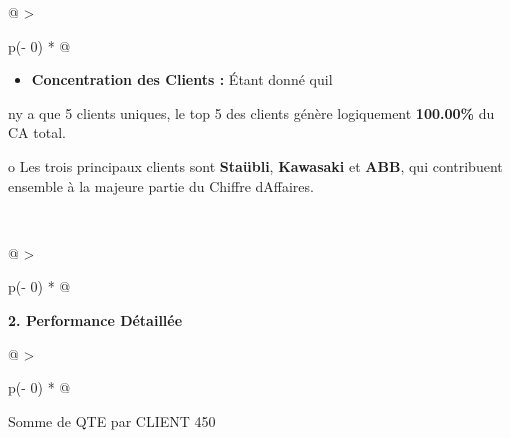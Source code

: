 \documentclass[
]{article}
\begin{document}
\begin{longtable}[]{@{}
  >{\raggedright\arraybackslash}p{(\columnwidth - 0\tabcolsep) * }@{}}
\begin{minipage}[b]{\linewidth}
\begin{itemize}
\item \textbf{Concentration des Clients :} Étant donné qu\textquotesingle il
\end{itemize}
n\textquotesingle y a que 5 clients uniques, le top 5 des clients génère
logiquement \textbf{100.00\%} du CA total.

o Les trois principaux clients sont \textbf{Staübli}, \textbf{Kawasaki}
et \textbf{ABB}, qui contribuent ensemble à la majeure partie du Chiffre
d\textquotesingle Affaires.
\end{minipage} \\
\midrule\noalign{}
\endhead
\bottomrule\noalign{}
\endlastfoot
\end{longtable}

\begin{longtable}[]{@{}
  >{\raggedright\arraybackslash}p{(\columnwidth - 0\tabcolsep) * }@{}}
\toprule\noalign{}
\begin{minipage}[b]{\linewidth}\raggedright
\begin{center}
\end{center}

\begin{center}
\end{center}

\textbf{2. Performance Détaillée}

\begin{tabular}{@{}
  >{\raggedright\arraybackslash}p{(\columnwidth - 0\tabcolsep) * }@{}}
\toprule\noalign{}
\begin{minipage}[b]{\linewidth}\raggedright
Somme de QTE par CLIENT 450


\end{minipage}
\end{tabular}
\end{minipage}
\end{longtable}
\end{document}
